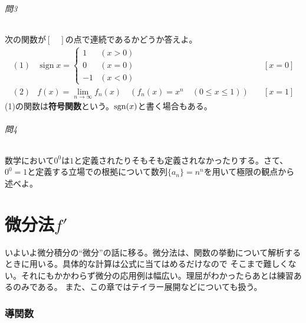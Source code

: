 \documentclass[a4j,dvipdfmx]{jsarticle}
\newcommand{\sign}{\mathop{\mathrm{sign}}\nolimits}
\newcommand{\linktoMOKUZI}{\vspace{\stretch{1}}\fbox{\centerline{\hyperref[目次]{目次に戻る}}}}
\begin{document}
                \paragraph{問3}
                    次の関数が$[\quad]$の点で連続であるかどうか答えよ。
                    \begin{align*}
                        (1)&\sign x = \left\{\begin{array}{cc}\displaystyle 1 & (x>0) \\ 0 & (x=0) \\ -1 & (x<0)\end{array}\right.&\quad [x=0]\\
                        (2)&f(x)=\lim_{n\to \infty}f_n(x)\quad (f_n(x)=x^n\quad(0\leq x\leq 1))&\quad [x=1]
                    \end{align*} 
                    (1)の関数は\textbf{符号関数}という。${\rm sgn}(x)$と書く場合もある。

                \paragraph{問4}
                    数学において$0^0$は$1$と定義されたりそもそも定義されなかったりする。さて、$0^0=1$と定義する立場での根拠について数列$\{a_n\}=n^n$を用いて極限の観点から述べよ。
                
                \linktoMOKUZI
                
    \clearpage
    \part{微分法$f'$}
    \begin{screen}
        いよいよ微分積分の``微分''の話に移る。微分法は、関数の挙動について解析するときに用いる。具体的な計算は公式に当てはめるだけなので
        そこまで難しくない。それにもかかわらず微分の応用例は幅広い。理屈がわかったらあとは練習あるのみである。
        また、この章ではテイラー展開などについても扱う。
    \end{screen}
    \clearpage
    \section{導関数}
\end{document}
